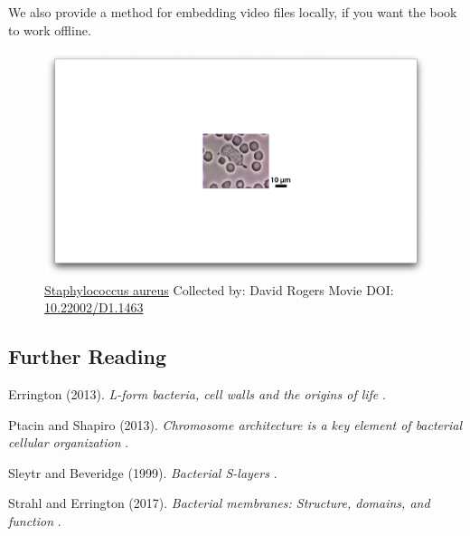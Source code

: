 \documentclass[]{tufte-book}
\begin{document}
We also provide a method for embedding video files locally, if you want
the book to work offline.

\begin{figure}
\includegraphics{movie_stills/1_1} \caption[\protect\hyperlink{methods}{Staphylococcus aureus} Collected
by: David Rogers Movie DOI:
\href{https://doi.org/10.22002/D1.1463}{10.22002/D1.1463}]{\protect\hyperlink{methods}{Staphylococcus aureus} Collected
by: David Rogers Movie DOI:
\href{https://doi.org/10.22002/D1.1463}{10.22002/D1.1463}}\label{fig:1-1-embed}
\end{figure}

\subsection*{Further Reading}\label{further-reading}

Errington (2013). \emph{L-form bacteria, cell walls and the origins of
life} \citep{errington2013}.

Ptacin and Shapiro (2013). \emph{Chromosome architecture is a key
element of bacterial cellular organization} \citep{ptacin2013}.

Sleytr and Beveridge (1999). \emph{Bacterial S-layers}
\citep{sleytr1999}.

Strahl and Errington (2017). \emph{Bacterial membranes: Structure,
domains, and function} \citep{strahl2017}.


\end{document}
